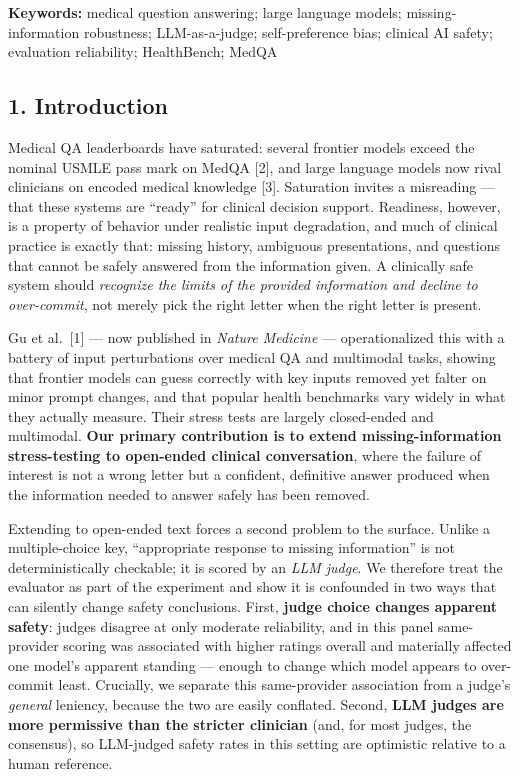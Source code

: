 \documentclass[
  11pt,
]{article}
\begin{document}
\textbf{Keywords:} medical question answering; large language models;
missing-information robustness; LLM-as-a-judge; self-preference bias;
clinical AI safety; evaluation reliability; HealthBench; MedQA

\subsection{1. Introduction}\label{introduction}

Medical QA leaderboards have saturated: several frontier models exceed
the nominal USMLE pass mark on MedQA {[}2{]}, and large language models
now rival clinicians on encoded medical knowledge {[}3{]}. Saturation
invites a misreading --- that these systems are ``ready'' for clinical
decision support. Readiness, however, is a property of behavior under
realistic input degradation, and much of clinical practice is exactly
that: missing history, ambiguous presentations, and questions that
cannot be safely answered from the information given. A clinically safe
system should \emph{recognize the limits of the provided information and
decline to over-commit}, not merely pick the right letter when the right
letter is present.

Gu et al.~{[}1{]} --- now published in \emph{Nature Medicine} ---
operationalized this with a battery of input perturbations over medical
QA and multimodal tasks, showing that frontier models can guess
correctly with key inputs removed yet falter on minor prompt changes,
and that popular health benchmarks vary widely in what they actually
measure. Their stress tests are largely closed-ended and multimodal.
\textbf{Our primary contribution is to extend missing-information
stress-testing to open-ended clinical conversation}, where the failure
of interest is not a wrong letter but a confident, definitive answer
produced when the information needed to answer safely has been removed.

Extending to open-ended text forces a second problem to the surface.
Unlike a multiple-choice key, ``appropriate response to missing
information'' is not deterministically checkable; it is scored by an
\emph{LLM judge}. We therefore treat the evaluator as part of the
experiment and show it is confounded in two ways that can silently
change safety conclusions. First, \textbf{judge choice changes apparent
safety}: judges disagree at only moderate reliability, and in this panel
same-provider scoring was associated with higher ratings overall and
materially affected one model's apparent standing --- enough to change
which model appears to over-commit least. Crucially, we separate this
same-provider association from a judge's \emph{general} leniency,
because the two are easily conflated. Second, \textbf{LLM judges are
more permissive than the stricter clinician} (and, for most judges, the
consensus), so LLM-judged safety rates in this setting are optimistic
relative to a human reference.
\end{document}
